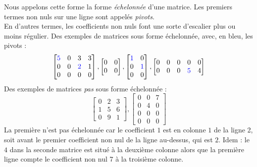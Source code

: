 \documentclass{article}
\begin{document}
Nous appelons cette forme la forme \textit{échelonnée} d'une matrice. Les premiers termes non nuls sur une ligne sont appelés \textit{pivots}. \\
En d'autres termes, les coefficients non nuls font une sorte d'escalier plus ou moins régulier. Des exemples de matrices sous forme échelonnée, avec, en bleu, les pivots :
$$
\begin{bmatrix}
\color{blue}5 & 0 & 3 & 3 \\
0 & 0 & \color{blue}2 & 1 \\
0 & 0 & 0 & 0
\end{bmatrix},
\begin{bmatrix}
0 & 0 \\
0 & 0
\end{bmatrix},
\begin{bmatrix}
\color{blue}1 & 0\\
0 & \color{blue}1\\
0 & 0
\end{bmatrix},
\begin{bmatrix}
0 & 0 & 0 & 0 & 0 \\
0 & 0 & 0 & \color{blue}5 & 4
\end{bmatrix}
$$
Des exemples de matrices \textit{pas} sous forme échelonnée :
$$
\begin{bmatrix}
0 & 2 & 3 \\
1 & 5 & 6\\
0 & 9 & 1
\end{bmatrix},
\begin{bmatrix}
0 & 0 & 7 \\
0 & 4 & 0\\
0 & 0 & 0\\
0 & 0 & 0
\end{bmatrix}
$$
La première n'est pas échelonnée car le coefficient $1$ est en colonne $1$ de la ligne 2, soit avant le premier coefficient non nul de la ligne au-dessus, qui est $2$. Idem : le $4$ dans la seconde matrice est situé à la deuxième colonne alors que la première ligne compte le coefficient non nul 7 à la troisième colonne.\\
\end{document}
